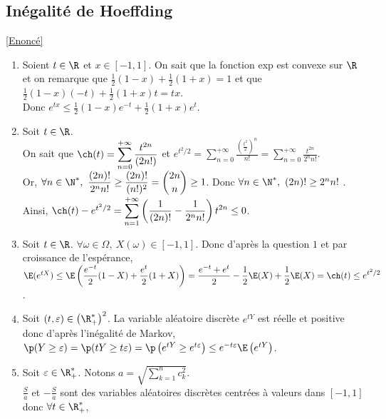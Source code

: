 \documentclass[8pt]{book}
\begin{document}
	\subsection{Inégalité de Hoeffding }
	\label{Inégalité de Hoeffding corrigé}
		\textcolor{blue}{\hyperref[Inégalité de Hoeffding]{[Enoncé]}}\\
	\begin{enumerate}
		\item Soient $t\in \R$ et $x\in [-1,1]$. On sait que la fonction exp est convexe sur $\R$ et on remarque que $\displaystyle\frac{1}{2}(1-x)+\frac{1}{2}(1+x)=1$ et que $\displaystyle\frac{1}{2}(1-x)(-t)+\frac{1}{2}(1+x)t=tx$.\\
		Donc $e^{tx}\leq \displaystyle\frac{1}{2}(1-x)e^{-t}+\frac{1}{2}(1+x)e^t$.
		\item Soit $t\in \R$.\\
		On sait que $\ch(t)=\displaystyle\sum\limits_{n=0}^{+\infty}\frac{t^{2n}}{(2n!)}$ et $e^{t^2/2}=\displaystyle\sum\limits_{n=0}^{+\infty}\frac{\left(\frac{t^2}{2}\right)^n}{n!}=\sum\limits_{n=0}^{+\infty}\frac{t^{2n}}{2^nn!}$.\\
		Or, $\forall n\in \N^*,\ \displaystyle\frac{(2n)!}{2^nn!}\geq \frac{(2n)!}{(n!)^2}=\binom{2n}{n}\geq 1$. Donc $\forall n\in \N^*,\ (2n)!\geq 2^nn!$ .\\
		Ainsi, $\ch(t)-e^{t^2/2}=\displaystyle\sum\limits_{n=1}^{+\infty}\left(\frac{1}{(2n)!}-\frac{1}{2^nn!}\right)t^{2n}\leq 0$.
		\item Soit $t\in \R$. $\forall \omega\in \Omega,\ X(\omega)\in [-1,1]$. Donc d'après la question $1$ et par croissance de l'espérance,\\
		$\E(e^{tX})\leq \displaystyle\E\left(\frac{e^{-t}}{2}(1-X)+\frac{e^t}{2}(1+X)\right)=\frac{e^{-t}+e^t}{2}-\frac{1}{2}\E(X)+\frac{1}{2}\E(X)=\ch(t)\leq e^{t^2/2}$.
		\item Soit $(t,\varepsilon)\in \left(\R^*_+\right)^2$. La variable aléatoire discrète $e^{tY}$ est réelle et positive donc d'après l'inégalité de Markov,\\
		$\p(Y\geq \varepsilon)=\p(tY\geq t\varepsilon)=\p\left(e^{tY}\geq e^{t\varepsilon}\right)\leq e^{-t\varepsilon}\E\left(e^{tY}\right)$.
		\item Soit $\varepsilon\in \R^*_+$. Notons $a=\displaystyle\sqrt{\displaystyle\sum\limits_{k=1}^nc_k^2}$.\\
		$\displaystyle\frac{S}{a}$ et $-\displaystyle\frac{S}{a}$ sont des variables aléatoires discrètes centrées à valeurs dans $[-1,1]$ donc $\forall t\in \R^*_+$,\\

\end{enumerate}
\end{document}
